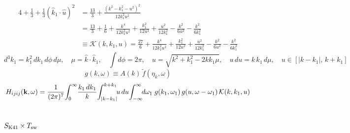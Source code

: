 \documentclass[10pt,prd,aps,nobibnotes,superscriptaddress,preprintnumbers,notitlepage]{revtex4-1}
\newcommand{\khat}{\hat{k}}
\newcommand{\kb}{{\bf k}}
\newcommand{\tf}{\tilde{f}}
\begin{document}
\begin{align}
  4+\tfrac13+\tfrac13(\khat_1\cdot\hat u)^2
  &=\frac{13}{3}+\frac{(k^2-k_1^2-u^2)^2}{12k_1^2u^2}
  \nonumber\\
  &=\frac{13}{3}+\frac{1}{6}
   +\frac{k^4}{12k_1^2u^2}+\frac{k_1^2}{12u^2}+\frac{u^2}{12k_1^2}
   -\frac{k^2}{6u^2}-\frac{k^2}{6k_1^2}
  \nonumber\\
  &\equiv\mathcal{K}(k,k_1,u)
   =\frac{27}{6}+\frac{k^4}{12k_1^2u^2}+\frac{k_1^2}{12u^2}+\frac{u^2}{12k_1^2}
   -\frac{k^2}{6u^2}-\frac{k^2}{6k_1^2}
  \label{A:Kkernel}
\end{align}
\begin{equation}
  d^3k_1=k_1^2\,dk_1\,d\phi\,d\mu,
  \quad \mu=\khat\cdot\khat_1,
  \quad \int d\phi=2\pi,
  \quad u=\sqrt{k^2+k_1^2-2kk_1\mu},
  \quad u\,du=k\,k_1\,d\mu,
  \quad u\in[|k-k_1|,\,k+k_1]
  \label{A:spherical}
\end{equation}
\begin{equation}
  g(k,\omega)\equiv A(k)\,\tf(\eta_k,\omega)
  \label{A:gdef}
\end{equation}
\begin{equation}
  H_{ijij}(\kb,\omega)=\frac{1}{(2\pi)^7}\!\int_0^\infty\!\frac{k_1\,dk_1}{k}
  \!\int_{|k-k_1|}^{k+k_1}\!\!u\,du\!\int_{-\infty}^{\infty}\!\!d\omega_1\;
  g(k_1,\omega_1)\,g(u,\omega-\omega_1)\,\mathcal{K}(k,k_1,u)
  \label{A:conversion}
\end{equation}

\subsection{\texorpdfstring{$S_{\rm K41}\times T_{\rm sw}$}{S\_K41 x T\_sw}}
\label{sec:chain-k41sw}
\end{document}
